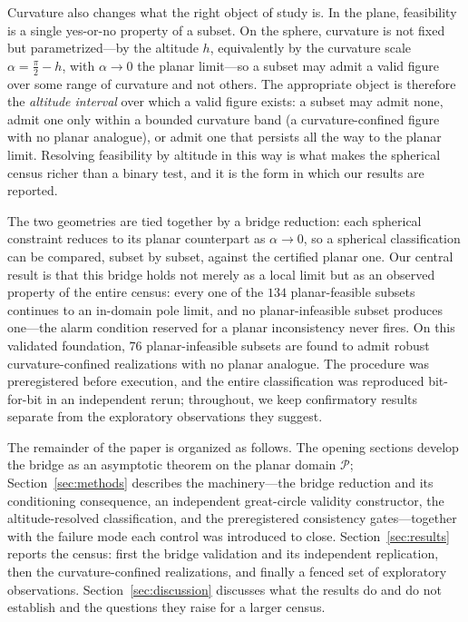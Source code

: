 \documentclass[pdflatex,sn-mathphys-num]{sn-jnl}
\theoremstyle{thmstyleone}%
\theoremstyle{thmstyletwo}%
\theoremstyle{thmstylethree}%
\begin{document}
Curvature also changes what the right object of study is. In the plane,
feasibility is a single yes-or-no property of a subset. On the sphere, curvature is not fixed but parametrized---by the altitude $h$, equivalently by the curvature scale $\alpha=\tfrac{\pi}{2}-h$, with $\alpha\to 0$ the planar limit---so a subset may admit a valid figure over some range of curvature and not others. The appropriate object is therefore the \emph{altitude interval} over which a valid figure exists: a subset may admit none, admit one only within a bounded curvature band (a curvature-confined figure with no planar analogue), or admit one that persists all the way to the planar limit. Resolving feasibility by altitude in this way is what makes the spherical census richer than a binary test, and it is the form in which our results are reported.

The two geometries are tied together by a bridge reduction: each spherical
constraint reduces to its planar counterpart as $\alpha\to 0$, so a spherical
classification can be compared, subset by subset, against the certified planar one. Our central result is that this bridge holds not merely as a local limit but as an observed property of the entire census: every one of the $134$ planar-feasible subsets continues to an in-domain pole limit, and no planar-infeasible subset produces one---the alarm condition reserved for a planar inconsistency never fires. On this validated foundation, $76$ planar-infeasible subsets are found to admit robust curvature-confined realizations with no planar analogue. The procedure was preregistered before execution, and the entire classification was reproduced bit-for-bit in an independent rerun; throughout, we keep confirmatory results separate from the exploratory observations they suggest.

The remainder of the paper is organized as follows. The opening sections develop the bridge as an asymptotic theorem on the planar domain $\mathcal P$; Section~\ref{sec:methods} describes the machinery---the bridge reduction and its conditioning consequence, an independent great-circle validity constructor, the altitude-resolved classification, and the preregistered consistency gates---together with the failure mode each control was introduced to close. Section~\ref{sec:results} reports the census: first the bridge validation and its independent replication, then the curvature-confined realizations, and finally a fenced set of exploratory observations. Section~\ref{sec:discussion} discusses what the results do and do not establish and the questions they raise for a larger census.
\end{document}
